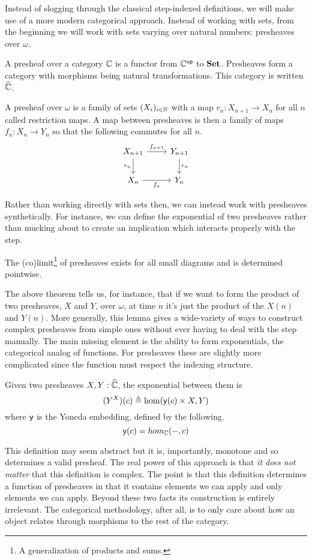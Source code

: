Instead of slogging through the classical step-indexed definitions, we
will make use of a more modern categorical approach. Instead of
working with sets, from the beginning we will work with sets varying
over natural numbers: presheaves over $\omega$.
\begin{defn}
  A presheaf over a category $\mathbb{C}$ is a functor from $\mathbb{C}^{\mathsf{op}}$ to
  $\mathbf{Set}$. Presheaves form a category with morphisms being natural
  transformations. This category is written $\widehat{\mathbb{C}}$.
\end{defn}
\begin{example}
  A presheaf over $\omega$ is a family of sets $(X_i)_{i \in \mathbb{N}}$
  with a map $r_n : X_{n + 1} \to X_n$ for all $n$ called restriction
  maps. A map between presheaves is then a family of maps
  $f_n : X_n \to Y_n$ so that the following commutes for all $n$.
  \[
    \begin{tikzcd}
      X_{n + 1} \ar[r, "f_{n + 1}"] \ar[d, swap, "r_n"] & Y_{n + 1} \ar[d, "r_n"]\\
      X_n \ar[r, swap, "f_n"] & Y_n
    \end{tikzcd}
  \]
\end{example}
Rather than working directly with sets then, we can instead work with
presheaves synthetically. For instance, we can define the exponential
of two presheaves rather than mucking about to create an implication
which interacts properly with the step.
\begin{lem}
  The (co)limit\footnote{A generalization of products and sums.} of
  presheaves exists for all small diagrams and is determined
  pointwise.
\end{lem}
The above theorem tells us, for instance, that if we want to form the
product of two presheaves, $X$ and $Y$, over $\omega$, at time $n$ it's just the
product of the $X(n)$ and $Y(n)$. More generally, this lemma gives a
wide-variety of ways to construct complex presheaves from simple ones
without ever having to deal with the step manually. The main missing
element is the ability to form exponentials, the categorical analog of
functions. For presheaves these are slightly more complicated since
the function must respect the indexing structure.
\begin{lem}
  Given two presheaves $X, Y : \widehat{\mathbb{C}}$, the exponential
  between them is
  \[
    (Y^X)(c) \triangleq \hom(\mathsf{y}(c) \times X, Y)
  \]
  where $\mathsf{y}$ is the Yoneda embedding, defined by the following.
  \[
    \mathsf{y}(c) = hom_{\mathbb{C}}(-, c)
  \]
\end{lem}
This definition may seem abstract but it is, importantly, monotone and
so determines a valid presheaf. The real power of this approach is
that \emph{it does not matter} that this definition is complex. The
point is that this definition determines a function of presheaves in
that it contains elements we can apply and only elements we can
apply. Beyond these two facts its construction is entirely
irrelevant. The categorical methodology, after all, is to only care
about how an object relates through morphisms to the rest of the
category. %

